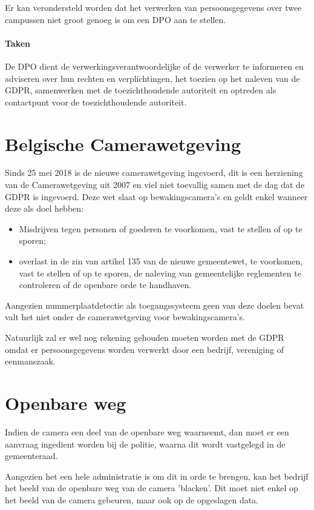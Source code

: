 Er kan verondersteld worden dat het verwerken van persoonsgegevens over twee campussen niet groot genoeg is om een DPO aan te stellen.

\paragraph{Taken}
De DPO dient de verwerkingsverantwoordelijke of de verwerker te informeren en adviseren over hun rechten en verplichtingen, het toezien op het naleven van de GDPR, samenwerken met de toezichthoudende autoriteit en optreden als contactpunt voor de toezichthoudende autoriteit.


\section{Belgische Camerawetgeving}
Sinds 25 mei 2018 is de nieuwe camerawetgeving ingevoerd, dit is een herziening van de Camerawetgeving uit 2007 en viel niet toevallig samen met de dag dat de GDPR is ingevoerd. Deze wet slaat op bewakingscamera's en geldt enkel wanneer deze als doel hebben:
\begin{itemize}
	\item Misdrijven tegen personen of goederen te voorkomen, vast te stellen of op te sporen;
	\item overlast in de zin van artikel 135 van de nieuwe gemeentewet, te voorkomen, vast te stellen of op te sporen, de naleving van gemeentelijke reglementen te controleren of de openbare orde te handhaven.
\end{itemize}
Aangezien nummerplaatdetectie als toegangssysteem geen van deze doelen bevat valt het niet onder de camerawetgeving voor bewakingscamera's. \autocite{staatsblad2007wet}

Natuurlijk zal er wel nog rekening gehouden moeten worden met de GDPR omdat er persoonsgegevens worden verwerkt door een bedrijf, vereniging of eenmanszaak. \autocite{gba2019videoparlofoon}

\section{Openbare weg}
Indien de camera een deel van de openbare weg waarneemt, dan moet er een aanvraag ingedient worden bij de politie, waarna dit wordt vastgelegd in de gemeenteraad. \autocite{beltug2018camerawet}

Aangezien het een hele administratie is om dit in orde te brengen, kan het bedrijf het beeld van de openbare weg van de camera 'blacken'. Dit moet niet enkel op het beeld van de camera gebeuren, maar ook op de opgeslagen data. \autocite{beltug2018camerawet}

